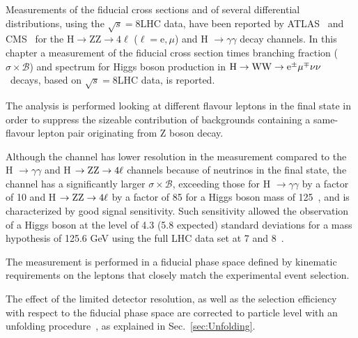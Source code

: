Measurements of the fiducial cross sections and of several differential
distributions, using the $\sqrt{s}=8$\TeV LHC data, have been reported by ATLAS~\cite{Aad:2014tca,Aad:2014lwa,Aad:2015lha} and CMS~\cite{Khachatryan:2015rxa,Khachatryan:2015yvw} for the ${\mathrm{H} \to \mathrm{ZZ} \to 4\ell}$ ($\ell = \mathrm{e},\mu$) and H $\to \gamma\gamma$ decay channels. In this chapter a measurement of the fiducial cross section times branching fraction ($\sigma \times \mathcal{B}$) and \pt{} spectrum for Higgs boson production in \ensuremath{\mathrm{H}\rightarrow{}\WW\rightarrow \mathrm{e}^{\pm} \mu^{\mp}\nu\nu} ~decays, based on $\sqrt{s} = 8$\TeV LHC data, is reported.

The analysis is performed looking at different flavour leptons in the final state in order to suppress the sizeable contribution of backgrounds containing a same-flavour lepton pair originating from Z boson decay.

Although the \hwwllnn{} channel has lower resolution in the \pth{} measurement
compared to the H $\to \gamma\gamma$ and  H $\to \rm{ZZ}\to 4\ell$ channels
because of neutrinos in the final state, the channel has a significantly
larger $\sigma \times \mathcal{B}$, exceeding those for H $\to \gamma\gamma$ by a factor
of 10 and H $\to \rm{ZZ}\to 4\ell$ by a factor of 85 for a Higgs boson mass of
125\GeV~\cite{Heinemeyer:2013tqa}, and is characterized by good signal
sensitivity. Such sensitivity allowed the observation of a Higgs boson at the level of 4.3 (5.8 expected)
standard deviations for a mass hypothesis of 125.6 GeV using the full LHC data set at 7 and 8\TeV~\cite{Chatrchyan:2013iaa}.

The measurement is performed in a fiducial phase space defined by kinematic requirements on
the leptons that closely match the experimental event selection.

The effect of the limited detector resolution, as well as the
selection efficiency with respect to the fiducial phase space are corrected to
particle level with an unfolding procedure~\cite{Cowan:2002in}, as explained in Sec.~\ref{sec:Unfolding}.


